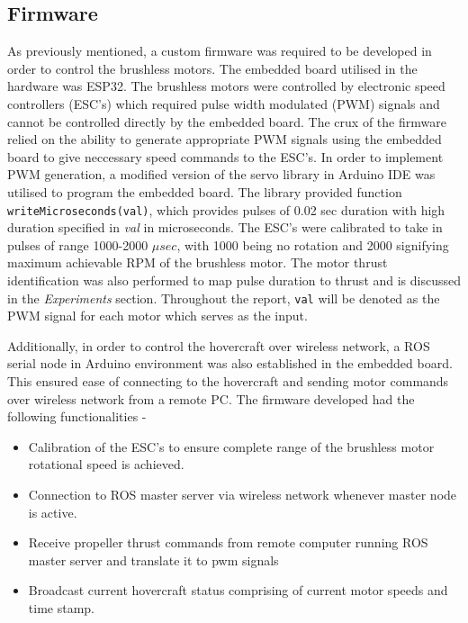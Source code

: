 \documentclass[12pt,titlepage]{article}
\begin{document}
\subsection{Firmware}
As previously mentioned, a custom firmware was required to be developed in order to control the brushless motors. The embedded board utilised in the hardware was ESP32. The brushless motors were controlled by electronic speed controllers (ESC's) which required pulse width modulated (PWM) signals and cannot be controlled directly by the embedded board. The crux of the firmware relied on the ability to generate appropriate PWM signals using the embedded board to give neccessary speed commands to the ESC's. In order to implement PWM generation, a modified version of the servo library in Arduino IDE was utilised to program the embedded board. The library provided function \texttt{writeMicroseconds(val)}, which provides pulses of 0.02 sec duration with high duration specified in \textit{val} in microseconds. The ESC's were calibrated to take in pulses of range 1000-2000 $\mu sec$, with 1000 being no rotation and 2000 signifying maximum achievable RPM of the brushless motor. The motor thrust identification was also performed to map pulse duration to thrust and is discussed in the \textit{Experiments} section. Throughout the report, \texttt{val} will be denoted as the PWM signal for each motor which serves as the input.

Additionally, in order to control the hovercraft over wireless network, a ROS serial node in Arduino environment was also established in the embedded board. This ensured ease of connecting to the hovercraft and sending motor commands over wireless network from a remote PC. The firmware developed had the following functionalities - 
\begin{itemize}
    \item Calibration of the ESC's to ensure complete range of the brushless motor rotational speed is achieved.
    \item Connection to ROS master server via wireless network whenever master node is active. 
    \item Receive propeller thrust commands from remote computer running ROS master server and translate it to pwm signals
    \item Broadcast current hovercraft status comprising of current motor speeds and time stamp. 
\end{itemize}
\end{document}
